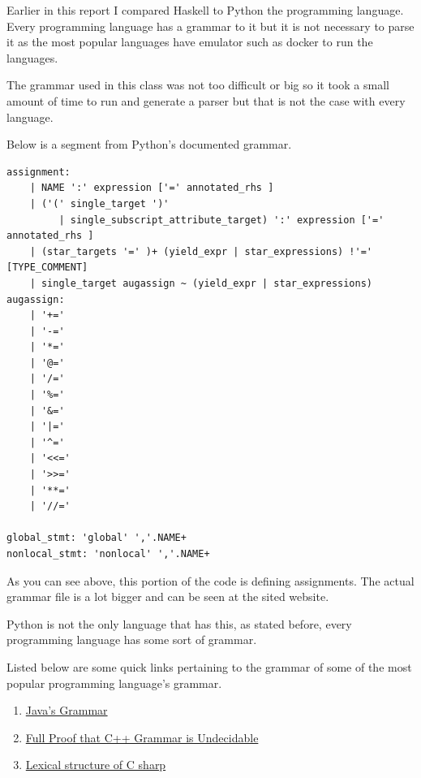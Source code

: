 \documentclass{article}
\begin{document}
\medskip\noindent
Earlier in this report I compared Haskell to Python the programming language. Every programming language has a grammar to it but it is not necessary to parse it as the most popular languages have emulator such as docker to run the languages.

\medskip\noindent
The grammar used in this class was not too difficult or big so it took a small amount of time to run and generate a parser but that is not the case with every language.

\medskip\noindent
Below is a segment from Python's documented grammar.

\medskip\noindent
\begin{lstlisting}
assignment:
    | NAME ':' expression ['=' annotated_rhs ] 
    | ('(' single_target ')' 
         | single_subscript_attribute_target) ':' expression ['=' annotated_rhs ] 
    | (star_targets '=' )+ (yield_expr | star_expressions) !'=' [TYPE_COMMENT] 
    | single_target augassign ~ (yield_expr | star_expressions) 
augassign:
    | '+=' 
    | '-=' 
    | '*=' 
    | '@=' 
    | '/=' 
    | '%=' 
    | '&=' 
    | '|=' 
    | '^=' 
    | '<<=' 
    | '>>=' 
    | '**=' 
    | '//=' 

global_stmt: 'global' ','.NAME+ 
nonlocal_stmt: 'nonlocal' ','.NAME+ 
\end{lstlisting}
\cite{PYT} 

\medskip\noindent
As you can see above, this portion of the code is defining assignments. The actual grammar file is a lot bigger and can be seen at the sited website.  

\medskip\noindent
Python is not the only language that has this, as stated before, every programming language has some sort of grammar.

\medskip\noindent
Listed below are some quick links pertaining to the grammar of some of the most popular programming language's grammar.

\begin{enumerate}
  \item \href{http://www.csci.csusb.edu/dick/samples/java.syntax.html}{Java's Grammar} 
  \item \href{https://medium.com/@mujjingun_23509/full-proof-that-c-grammar-is-undecidable-34e22dd8b664}{Full Proof that C++ Grammar is Undecidable} 
  \item \href{https://docs.microsoft.com/en-us/dotnet/csharp/language-reference/language-specification/lexical-structure}{Lexical structure of C sharp} 
\end{enumerate}
\end{document}
